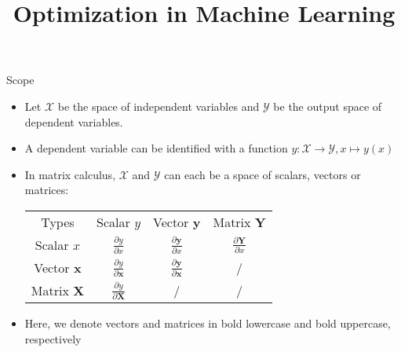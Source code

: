 \documentclass[11pt,compress,t,notes=noshow, xcolor=table]{beamer}
\title{Optimization in Machine Learning}
\date{}
\begin{document}
\sloppy



\begin{vbframe}{Scope}
\begin{itemize}
    \item Let $\mathcal{X}$ be the space of independent variables and $\mathcal{Y}$ be the output space of dependent variables.
    \item A dependent variable can be identified with a function $y: \mathcal{X} \to \mathcal{Y}, x\mapsto y(x)$ \item In matrix calculus, $\mathcal{X}$ and $\mathcal{Y}$ can each be a space of scalars, vectors or matrices:
    \begin{table}[]
        \centering
        \begin{tabular}{cccc}
             Types& Scalar $y$ &Vector $\mathbf{y}$&Matrix $\mathbf{Y}$ \\
             Scalar $x$& $\frac{\partial y}{\partial x}$ & $\frac{\partial \mathbf{y}}{\partial x}$ & $\frac{\partial \mathbf{Y}}{\partial x}$ \\
             Vector $\mathbf{x}$& $\frac{\partial y}{\partial \mathbf{x}}$ & $\frac{\partial \mathbf{y}}{\partial \mathbf{x}}$ & / \\
             Matrix $\mathbf{X}$& $\frac{\partial y}{\partial \mathbf{X}}$ & / & / 
        \end{tabular}
    \end{table}
    \item Here, we denote vectors and matrices in bold lowercase and bold uppercase, respectively
\end{itemize}
\end{vbframe}
\end{document}
